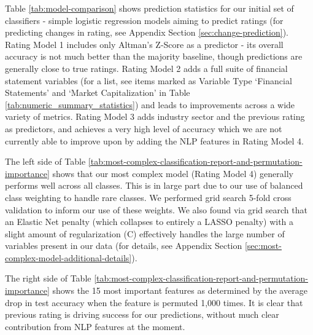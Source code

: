 \documentclass{article}[11pt]
\begin{document}
    Table \ref{tab:model-comparison} shows prediction statistics for our initial set of classifiers - simple logistic regression models aiming to predict ratings (for predicting changes in rating, see Appendix Section \ref{sec:change-prediction}). Rating Model 1 includes only Altman's Z-Score as a predictor - its overall accuracy is not much better than the majority baseline, though predictions are generally close to true ratings. Rating Model 2 adds a full suite of financial statement variables (for a list, see items marked as Variable Type `Financial Statements' and `Market Capitalization' in Table \ref{tab:numeric_summary_statistics}) and leads to improvements across a wide variety of metrics. Rating Model 3 adds industry sector and the previous rating as predictors, and achieves a very high level of accuracy which we are not currently able to improve upon by adding the NLP features in Rating Model 4.

    The left side of Table \ref{tab:most-complex-classification-report-and-permutation-importance} shows that our most complex model (Rating Model 4) generally performs well across all classes. This is in large part due to our use of balanced class weighting to handle rare classes. We performed grid search 5-fold cross validation to inform our use of these weights. We also found via grid search that an Elastic Net penalty (which collapses to entirely a LASSO penalty) with a slight amount of regularization (C) effectively handles the large number of variables present in our data (for details, see Appendix Section \ref{sec:most-complex-model-additional-details}). 
    
    The right side of Table \ref{tab:most-complex-classification-report-and-permutation-importance} shows the 15 most important features as determined by the average drop in test accuracy when the feature is permuted 1,000 times. It is clear that previous rating is driving success for our predictions, without much clear contribution from NLP features at the moment.


\end{document}
